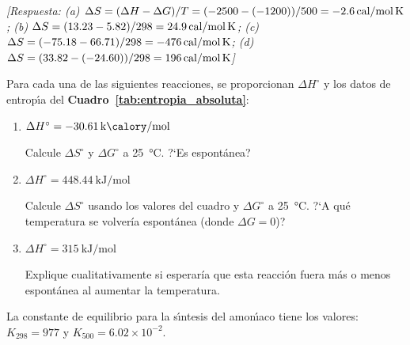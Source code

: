 \begin{bloque_ejercicios}
\begin{ejercicios}
\textit{[Respuesta:
(a) $\Delta S = (\Delta H - \Delta G)/T
= (-2500-(-1200))/500 = \SI{-2.6}{\text{cal/mol\,K}}$;
(b) $\Delta S = (13.23-5.82)/298 = \SI{+24.9}{\text{cal/mol\,K}}$;
(c) $\Delta S = (-75.18-66.71)/298 = \SI{-476}{\text{cal/mol\,K}}$;
(d) $\Delta S = (33.82-(-24.60))/298 = \SI{+196}{\text{cal/mol\,K}}$]}

\item Para cada una de las siguientes reacciones, se proporcionan
$\Delta H^\circ$ y los datos de entrop\'{\i}a del
\textbf{Cuadro~\ref{tab:entropia_absoluta}}:

\begin{enumerate}[label=\alph*)]
    \item {}
          \hfill $\Delta H^\circ = \SI{-30.61}{\kilo\calory\per\mole}$

          Calcule $\Delta S^\circ$ y $\Delta G^\circ$ a \SI{25}{\celsius}.
          ?`Es espont\'anea?

    \item {}
          \hfill $\Delta H^\circ = \SI{+448.44}{\kilo\joule\per\mole}$

          Calcule $\Delta S^\circ$ usando los valores del
          cuadro y $\Delta G^\circ$ a \SI{25}{\celsius}.
          ?`A qu\'e temperatura se volver\'ia espont\'anea
          (donde $\Delta G = 0$)?

    \item {}
          \hfill $\Delta H^\circ = \SI{+315}{\kilo\joule\per\mole}$

          Explique cualitativamente si esperar\'ia que esta
          reacci\'on fuera m\'as o menos espont\'anea al
          aumentar la temperatura.
\end{enumerate}

\item La constante de equilibrio para la s\'{\i}ntesis del
amon\'{\i}aco  tiene los valores:
$K_{298} = 977$ y $K_{500} = 6.02\times10^{-2}$.


\end{ejercicios}
\end{bloque_ejercicios}

